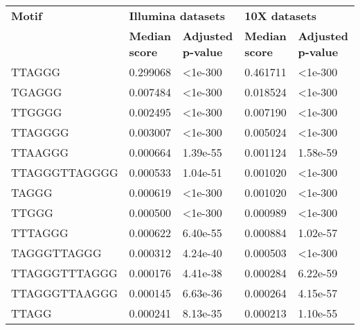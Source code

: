 \begin{samepage} \begin{table}[h!] \small \begin{tabular}{lllll}
\hline
\textbf{Motif}  & \multicolumn{2}{l}{\textbf{Illumina datasets}}    & \multicolumn{2}{l}{\textbf{10X datasets}}         \\
\textbf{}       & \textbf{Median score} & \textbf{Adjusted p-value} & \textbf{Median score} & \textbf{Adjusted p-value} \\
\hline
TTAGGG          & 0.299068              & <1e-300                   & 0.461711              & <1e-300                   \\
TGAGGG          & 0.007484              & <1e-300                   & 0.018524              & <1e-300                   \\
TTGGGG          & 0.002495              & <1e-300                   & 0.007190              & <1e-300                   \\
TTAGGGG         & 0.003007              & <1e-300                   & 0.005024              & <1e-300                   \\
TTAAGGG         & 0.000664              & 1.39e-55                  & 0.001124              & 1.58e-59                  \\
TTAGGGTTAGGGG   & 0.000533              & 1.04e-51                  & 0.001020              & <1e-300                   \\
TAGGG           & 0.000619              & <1e-300                   & 0.001020              & <1e-300                   \\
TTGGG           & 0.000500              & <1e-300                   & 0.000989              & <1e-300                   \\
TTTAGGG         & 0.000622              & 6.40e-55                  & 0.000884              & 1.02e-57                  \\
TAGGGTTAGGG     & 0.000312              & 4.24e-40                  & 0.000503              & <1e-300                   \\
TTAGGGTTTAGGG   & 0.000176              & 4.41e-38                  & 0.000284              & 6.22e-59                  \\
TTAGGGTTAAGGG   & 0.000145              & 6.63e-36                  & 0.000264              & 4.15e-57                  \\
TTAGG           & 0.000241              & 8.13e-35                  & 0.000213              & 1.10e-55                  \\

\end{tabular}
\end{table}
\end{samepage}
